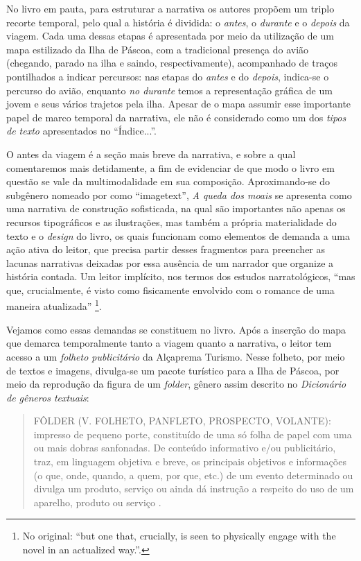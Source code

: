 \documentclass[portuguese]{textolivre}
\begin{document}
No livro em pauta, para estruturar a narrativa os autores propõem um triplo
recorte temporal, pelo qual a história é dividida: o \textit{antes}, o
\textit{durante} e o \textit{depois} da viagem. Cada uma dessas etapas é
apresentada por meio da utilização de um mapa estilizado da Ilha de Páscoa, com
a tradicional presença do avião (chegando, parado na ilha e saindo,
respectivamente), acompanhado de traços pontilhados a indicar percursos: nas
etapas do \textit{antes} e do \textit{depois}, indica-se o percurso do avião,
enquanto \textit{no durante} temos a representação gráfica de um jovem e seus
vários trajetos pela ilha. Apesar de o mapa assumir esse importante papel de
marco temporal da narrativa, ele não é considerado como um dos \textit{tipos de
texto} apresentados no “Índice...”.

O antes da viagem é a seção mais breve da narrativa, e sobre a qual
comentaremos mais detidamente, a fim de evidenciar de que modo o livro em
questão se vale da multimodalidade em sua composição. Aproximando-se do
subgênero nomeado por \textcite[p.~99]{gibbons_i_2010} como “imagetext”,
\textit{A queda dos moais} se apresenta como uma narrativa de construção
sofisticada, na qual são importantes não apenas os recursos tipográficos e as
ilustrações, mas também a própria materialidade do texto e o \textit{design} do
livro, os quais funcionam como elementos de demanda a uma ação ativa do leitor,
que precisa partir desses fragmentos para preencher as lacunas narrativas
deixadas por essa ausência de um narrador que organize a história contada. Um
leitor implícito, nos termos dos estudos narratológicos, “mas que,
crucialmente, é visto como fisicamente envolvido com o romance de uma maneira
atualizada” \cite[p.~100]{gibbons_i_2010}\footnote{No original: “but one that,
crucially, is seen to physically engage with the novel in an actualized
way.”.}.

Vejamos como essas demandas se constituem no livro. Após a inserção do mapa que
demarca temporalmente tanto a viagem quanto a narrativa, o leitor tem acesso a
um \textit{folheto publicitário} da Alçaprema Turismo. Nesse folheto, por meio
de textos e imagens, divulga-se um pacote turístico para a Ilha de Páscoa, por
meio da reprodução da figura de um \textit{folder}, gênero assim descrito no
\textit{Dicionário de gêneros textuais}:

\begin{quote}
    FÔLDER (V. FOLHETO, PANFLETO, PROSPECTO, VOLANTE): impresso de pequeno
    porte, constituído de uma só folha de papel com uma ou mais dobras
    sanfonadas. De conteúdo informativo e/ou publicitário, traz, em linguagem
    objetiva e breve, os principais objetivos e informações (o que, onde,
    quando, a quem, por que, etc.) de um evento determinado ou divulga um
    produto, serviço ou ainda dá instrução a respeito do uso de um aparelho,
    produto ou serviço \cite[p.~127, destaques do original]{costa_dicionario_2012}.
\end{quote}
\end{document}

